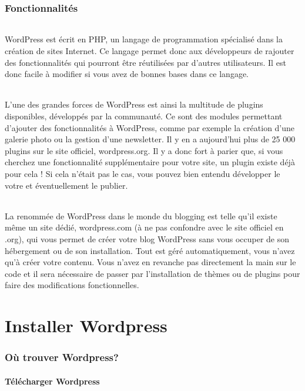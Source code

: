 \documentclass[10pt,a4paper]{article}
\begin{document}
\section{Fonctionnalités}
\paragraph{}WordPress est écrit en PHP, un langage de programmation spécialisé dans la création de sites Internet. Ce langage permet donc aux développeurs de rajouter des fonctionnalités qui pourront être réutilisées par d’autres utilisateurs. Il est donc facile à modifier si vous avez de bonnes bases dans ce langage.
\paragraph{}L’une des grandes forces de WordPress est ainsi la multitude de plugins disponibles, développés par la communauté. Ce sont des modules permettant d'ajouter des fonctionnalités à WordPress, comme par exemple la création d'une galerie photo ou la gestion d'une newsletter. Il y en a aujourd’hui plus de 25 000 plugins sur le site officiel, wordpress.org. Il y a donc fort à parier que, si vous cherchez une fonctionnalité supplémentaire pour votre site, un plugin existe déjà pour cela ! Si cela n’était pas le cas, vous pouvez bien entendu développer le votre et éventuellement le publier.
\paragraph{}La renommée de WordPress dans le monde du blogging est telle qu’il existe même un site dédié, wordpress.com (à ne pas confondre avec le site officiel en .org), qui vous permet de créer votre blog WordPress sans vous occuper de son hébergement ou de son installation. Tout est géré automatiquement, vous n’avez qu’à créer votre contenu. Vous n’avez en revanche pas directement la main sur le code et il sera nécessaire de passer par l’installation de thèmes ou de plugins pour faire des modifications fonctionnelles.
\newpage

\part{Installer Wordpress}
\newpage

\section{Où trouver Wordpress?}
\subsection{Télécharger Wordpress}
\end{document}
